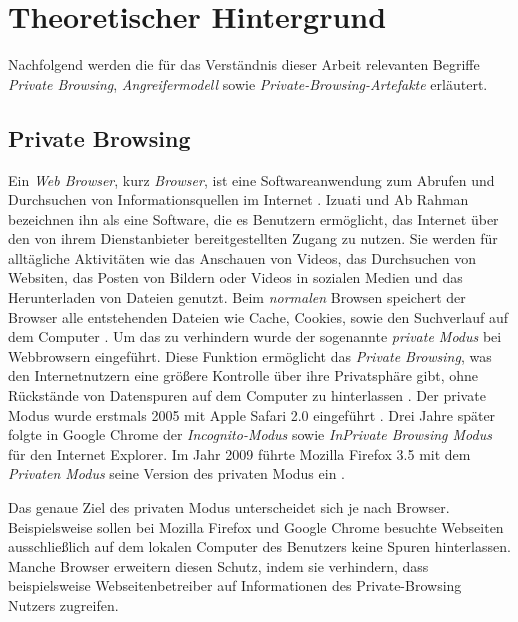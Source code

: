 \chapter{Theoretischer Hintergrund}\label{chap:theorie}

Nachfolgend werden die für das Verständnis dieser Arbeit relevanten Begriffe \textit{Private Browsing}, \textit{Angreifermodell} sowie \textit{Private-Browsing-Artefakte} erläutert.

\section{Private Browsing}\label{chap:theorie-private-browsing}

Ein \textit{Web Browser}, kurz \textit{Browser}, ist eine Softwareanwendung zum Abrufen und Durchsuchen von Informationsquellen im Internet \cite{Rochmadi.2017}. Izuati und Ab Rahman \cite{Izzati.2022} bezeichnen ihn als eine Software, die es Benutzern ermöglicht, das Internet über den von ihrem Dienstanbieter bereitgestellten Zugang zu nutzen. Sie werden für alltägliche Aktivitäten wie das Anschauen von Videos, das Durchsuchen von Websiten, das Posten von Bildern oder Videos in sozialen Medien und das Herunterladen von Dateien genutzt. \cite{Izzati.2022}
Beim \textit{normalen} Browsen speichert der Browser alle entstehenden Dateien wie Cache, Cookies, sowie den Suchverlauf auf dem Computer \cite{Izzati.2022}. Um das zu verhindern wurde der sogenannte \textit{private Modus} bei Webbrowsern eingeführt. Diese Funktion ermöglicht das \textit{Private Browsing}, was den Internetnutzern eine größere Kontrolle über ihre Privatsphäre gibt, ohne Rückstände von Datenspuren auf dem Computer zu hinterlassen \cite{Said.2011}. Der private Modus wurde erstmals 2005 mit Apple Safari 2.0 eingeführt \cite{Said.2011}. Drei Jahre später folgte in Google Chrome der \textit{Incognito-Modus} sowie \textit{InPrivate Browsing Modus} für den Internet Explorer. Im Jahr 2009 führte Mozilla Firefox 3.5 mit dem \textit{Privaten Modus} seine Version des privaten Modus ein \cite{Montasari.2015}.

Das genaue Ziel des privaten Modus unterscheidet sich je nach Browser. Beispielsweise sollen bei Mozilla Firefox und Google Chrome besuchte Webseiten ausschließlich auf dem lokalen Computer des Benutzers keine Spuren hinterlassen. \cite{MozillaWiki.05.06.2023,GoogleChrome.} Manche Browser erweitern diesen Schutz, indem sie verhindern, dass beispielsweise Webseitenbetreiber auf Informationen des Private-Browsing Nutzers zugreifen. \cite{Tor.24.05.2023}

